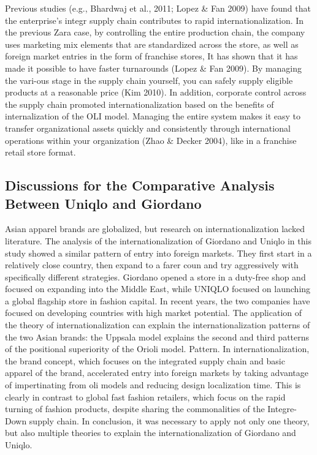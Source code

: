 \documentclass[12pt,]{article}
\begin{document}
Previous studies (e.g., Bhardwaj et al., 2011; Lopez \& Fan 2009) have
found that the enterprise's integr supply chain contributes to rapid
internationalization. In the previous Zara case, by controlling the
entire production chain, the company uses marketing mix elements that
are standardized across the store, as well as foreign market entries in
the form of franchise stores, It has shown that it has made it possible
to have faster turnarounds (Lopez \& Fan 2009). By managing the vari-ous
stage in the supply chain yourself, you can safely supply eligible
products at a reasonable price (Kim 2010). In addition, corporate
control across the supply chain promoted internationalization based on
the benefits of internalization of the OLI model. Managing the entire
system makes it easy to transfer organizational assets quickly and
consistently through international operations within your organization
(Zhao \& Decker 2004), like in a franchise retail store format.

\hypertarget{discussions-for-the-comparative-analysis-between-uniqlo-and-giordano}{%
\subsection{Discussions for the Comparative Analysis Between Uniqlo and
Giordano}\label{discussions-for-the-comparative-analysis-between-uniqlo-and-giordano}}

Asian apparel brands are globalized, but research on
internationalization lacked literature. The analysis of the
internationalization of Giordano and Uniqlo in this study showed a
similar pattern of entry into foreign markets. They first start in a
relatively close country, then expand to a farer coun and try
aggressively with specifically different strategies. Giordano opened a
store in a duty-free shop and focused on expanding into the Middle East,
while UNIQLO focused on launching a global flagship store in fashion
capital. In recent years, the two companies have focused on developing
countries with high market potential. The application of the theory of
internationalization can explain the internationalization patterns of
the two Asian brands: the Uppsala model explains the second and third
patterns of the positional superiority of the Orioli model. Pattern. In
internationalization, the brand concept, which focuses on the integrated
supply chain and basic apparel of the brand, accelerated entry into
foreign markets by taking advantage of impertinating from oli models and
reducing design localization time. This is clearly in contrast to global
fast fashion retailers, which focus on the rapid turning of fashion
products, despite sharing the commonalities of the Integre-Down supply
chain. In conclusion, it was necessary to apply not only one theory, but
also multiple theories to explain the internationalization of Giordano
and Uniqlo.
\end{document}
